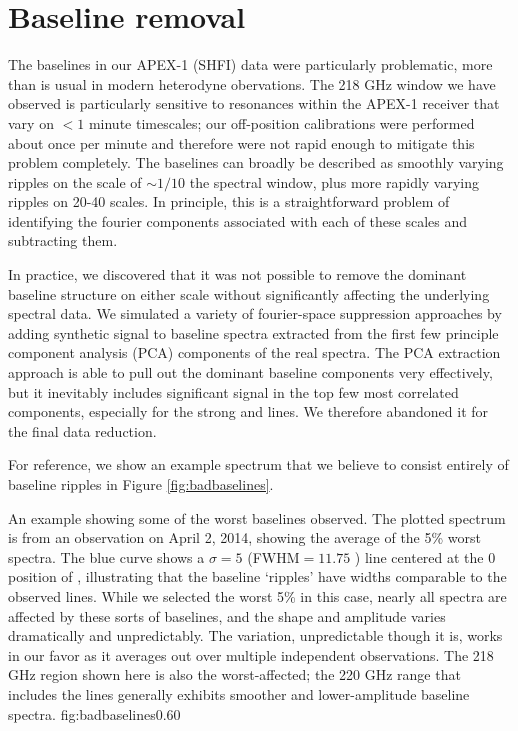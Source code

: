 \appendix
\section{Baseline removal}
\label{sec:baselineappendix}
The baselines in our APEX-1 (SHFI) data were particularly problematic, more than is
usual in modern heterodyne obervations.  The 218 GHz window we have observed is
particularly sensitive to resonances within the APEX-1 receiver that vary on
$<1$ minute timescales; our off-position calibrations were performed about once
per minute and therefore were not rapid enough to mitigate this problem
completely.  The baselines can broadly be described as smoothly varying ripples
on the scale of $\sim1/10$ the spectral window, plus more rapidly varying
ripples on 20-40 \kms scales.  In principle, this is a straightforward problem
of identifying the fourier components associated with each of these scales and
subtracting them.

In practice, we discovered that it was not possible to remove the dominant
baseline structure on either scale without significantly affecting the
underlying spectral data.  We simulated a variety of fourier-space suppression
approaches by adding synthetic signal to baseline spectra extracted from the
first few principle component analysis (PCA) components of the real spectra.
The PCA extraction approach is able to pull out the dominant baseline
components very effectively, but it inevitably includes significant signal in
the top few most correlated components, especially for the strong \formaldehyde
and \thirteenco lines.  We therefore abandoned it for the final data reduction.

For reference, we show an example spectrum that we believe to consist entirely
of baseline ripples in Figure \ref{fig:badbaselines}.

{An example showing some of the worst baselines observed.  The plotted spectrum
is from an observation on April 2, 2014, showing the average of the 5\% worst
spectra.  The blue curve shows a $\sigma=5$ \kms (FWHM$=11.75$ \kms) line centered
at the 0 \kms position of \para \threeohthree,
illustrating that the baseline `ripples' have widths comparable to the observed
lines.  While we selected the worst 5\% in this case, nearly all spectra are
affected by these sorts of baselines, and the shape and amplitude varies
dramatically and unpredictably.  The variation, unpredictable though it is,
works in our favor as it averages out over multiple independent observations.
The 218 GHz region shown here is also the worst-affected; the 220 GHz range
that includes the \thirteenco lines generally exhibits smoother and
lower-amplitude baseline spectra.}
{fig:badbaselines}{0.6}{0}

